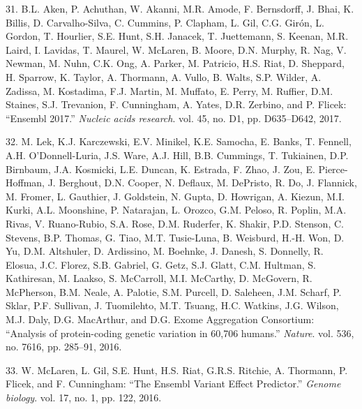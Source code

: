 \documentclass[12pt,twoside]{reedthesis}
\begin{document}
  \hypertarget{ref-Aken2017}{}
  31. B.L. Aken, P. Achuthan, W. Akanni, M.R. Amode, F. Bernsdorff, J.
  Bhai, K. Billis, D. Carvalho-Silva, C. Cummins, P. Clapham, L. Gil, C.G.
  Girón, L. Gordon, T. Hourlier, S.E. Hunt, S.H. Janacek, T. Juettemann,
  S. Keenan, M.R. Laird, I. Lavidas, T. Maurel, W. McLaren, B. Moore, D.N.
  Murphy, R. Nag, V. Newman, M. Nuhn, C.K. Ong, A. Parker, M. Patricio,
  H.S. Riat, D. Sheppard, H. Sparrow, K. Taylor, A. Thormann, A. Vullo, B.
  Walts, S.P. Wilder, A. Zadissa, M. Kostadima, F.J. Martin, M. Muffato,
  E. Perry, M. Ruffier, D.M. Staines, S.J. Trevanion, F. Cunningham, A.
  Yates, D.R. Zerbino, and P. Flicek: ``Ensembl 2017.'' \emph{Nucleic
  acids research}. vol. 45, no. D1, pp. D635--D642, 2017.
  
  \hypertarget{ref-Lek2016}{}
  32. M. Lek, K.J. Karczewski, E.V. Minikel, K.E. Samocha, E. Banks, T.
  Fennell, A.H. O'Donnell-Luria, J.S. Ware, A.J. Hill, B.B. Cummings, T.
  Tukiainen, D.P. Birnbaum, J.A. Kosmicki, L.E. Duncan, K. Estrada, F.
  Zhao, J. Zou, E. Pierce-Hoffman, J. Berghout, D.N. Cooper, N. Deflaux,
  M. DePristo, R. Do, J. Flannick, M. Fromer, L. Gauthier, J. Goldstein,
  N. Gupta, D. Howrigan, A. Kiezun, M.I. Kurki, A.L. Moonshine, P.
  Natarajan, L. Orozco, G.M. Peloso, R. Poplin, M.A. Rivas, V.
  Ruano-Rubio, S.A. Rose, D.M. Ruderfer, K. Shakir, P.D. Stenson, C.
  Stevens, B.P. Thomas, G. Tiao, M.T. Tusie-Luna, B. Weisburd, H.-H. Won,
  D. Yu, D.M. Altshuler, D. Ardissino, M. Boehnke, J. Danesh, S. Donnelly,
  R. Elosua, J.C. Florez, S.B. Gabriel, G. Getz, S.J. Glatt, C.M. Hultman,
  S. Kathiresan, M. Laakso, S. McCarroll, M.I. McCarthy, D. McGovern, R.
  McPherson, B.M. Neale, A. Palotie, S.M. Purcell, D. Saleheen, J.M.
  Scharf, P. Sklar, P.F. Sullivan, J. Tuomilehto, M.T. Tsuang, H.C.
  Watkins, J.G. Wilson, M.J. Daly, D.G. MacArthur, and D.G. Exome
  Aggregation Consortium: ``Analysis of protein-coding genetic variation
  in 60,706 humans.'' \emph{Nature}. vol. 536, no. 7616, pp. 285--91,
  2016.
  
  \hypertarget{ref-McLaren2016}{}
  33. W. McLaren, L. Gil, S.E. Hunt, H.S. Riat, G.R.S. Ritchie, A.
  Thormann, P. Flicek, and F. Cunningham: ``The Ensembl Variant Effect
  Predictor.'' \emph{Genome biology}. vol. 17, no. 1, pp. 122, 2016.
  
\end{document}
